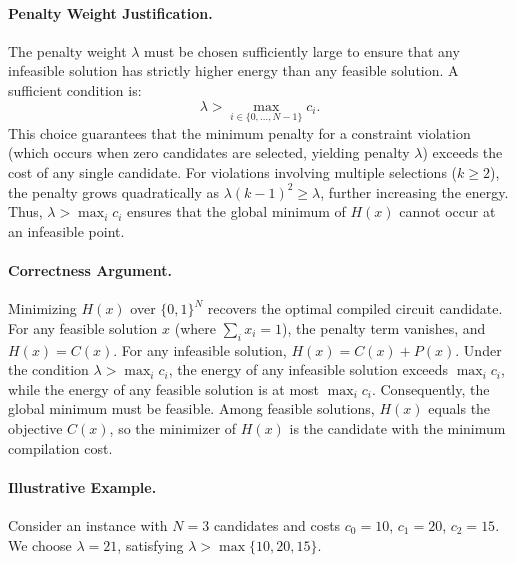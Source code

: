 \documentclass[12pt]{article}
\begin{document}
\paragraph{Penalty Weight Justification.}
The penalty weight $\lambda$ must be chosen sufficiently large to ensure that any infeasible solution has strictly higher energy than any feasible solution. A sufficient condition is:
\begin{equation}
    \lambda > \max_{i \in \{0, \dots, N-1\}} c_i.
\end{equation}
This choice guarantees that the minimum penalty for a constraint violation (which occurs when zero candidates are selected, yielding penalty $\lambda$) exceeds the cost of any single candidate. For violations involving multiple selections ($k \ge 2$), the penalty grows quadratically as $\lambda(k-1)^2 \ge \lambda$, further increasing the energy. Thus, $\lambda > \max_i c_i$ ensures that the global minimum of $H(x)$ cannot occur at an infeasible point.

\paragraph{Correctness Argument.}
Minimizing $H(x)$ over $\{0, 1\}^N$ recovers the optimal compiled circuit candidate. For any feasible solution $x$ (where $\sum_i x_i = 1$), the penalty term vanishes, and $H(x) = C(x)$. For any infeasible solution, $H(x) = C(x) + P(x)$. Under the condition $\lambda > \max_i c_i$, the energy of any infeasible solution exceeds $\max_i c_i$, while the energy of any feasible solution is at most $\max_i c_i$. Consequently, the global minimum must be feasible. Among feasible solutions, $H(x)$ equals the objective $C(x)$, so the minimizer of $H(x)$ is the candidate with the minimum compilation cost.

\paragraph{Illustrative Example.}
Consider an instance with $N=3$ candidates and costs $c_0 = 10$, $c_1 = 20$, $c_2 = 15$. We choose $\lambda = 21$, satisfying $\lambda > \max\{10, 20, 15\}$.
\end{document}

